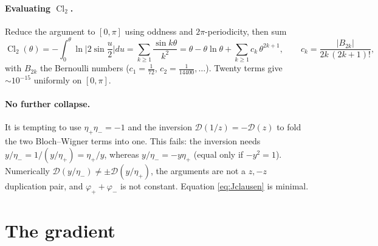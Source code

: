 \documentclass[11pt]{article}
\numberwithin{equation}{section}
\DeclareMathOperator{\Cl}{Cl}
\begin{document}
\paragraph{Evaluating $\Cl_2$.} Reduce the argument to $[0,\pi]$ using oddness and $2\pi$-periodicity,
then sum
\begin{equation}\label{eq:cl2}
  \Cl_2(\theta)=-\int_0^\theta\ln\Big|2\sin\frac{u}{2}\Big|du=\sum_{k\ge1}\frac{\sin k\theta}{k^2}
  =\theta-\theta\ln\theta+\sum_{k\ge1}c_k\,\theta^{2k+1},\qquad
  c_k=\frac{|B_{2k}|}{2k\,(2k+1)!},
\end{equation}
with $B_{2k}$ the Bernoulli numbers ($c_1=\tfrac1{72}$, $c_2=\tfrac1{14400},\dots$). Twenty terms give
$\sim10^{-15}$ uniformly on $[0,\pi]$.

\paragraph{No further collapse.} It is tempting to use $\eta_+\eta_-=-1$ and the inversion
$\mathcal D(1/z)=-\mathcal D(z)$ to fold the two Bloch--Wigner terms into one. This fails: the inversion
needs $y/\eta_-=1/(y/\eta_+)=\eta_+/y$, whereas $y/\eta_-=-y\eta_+$ (equal only if $-y^2=1$).
Numerically $\mathcal D(y/\eta_-)\ne\pm\mathcal D(y/\eta_+)$, the arguments are not a $z,-z$
duplication pair, and $\varphi_++\varphi_-$ is not constant. Equation \eqref{eq:Jclausen} is minimal.

\section{The gradient}\label{sec:grad}
\end{document}
